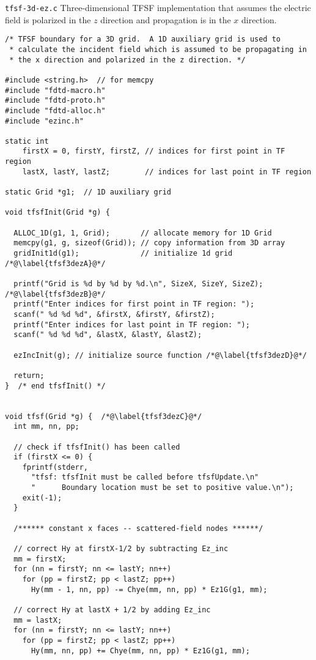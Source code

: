 \begin{program}
  {\tt tfsf-3d-ez.c} Three-dimensional TFSF implementation that
  assumes the electric field is polarized in the $z$ direction and
  propagation is in the $x$ direction.
\label{pro:3dTfsfEz}
\codemiddle
\begin{lstlisting}
/* TFSF boundary for a 3D grid.  A 1D auxiliary grid is used to
 * calculate the incident field which is assumed to be propagating in
 * the x direction and polarized in the z direction. */

#include <string.h>  // for memcpy
#include "fdtd-macro.h"
#include "fdtd-proto.h"
#include "fdtd-alloc.h"
#include "ezinc.h"

static int 
    firstX = 0, firstY, firstZ, // indices for first point in TF region
    lastX, lastY, lastZ;        // indices for last point in TF region

static Grid *g1;  // 1D auxiliary grid

void tfsfInit(Grid *g) {

  ALLOC_1D(g1, 1, Grid);       // allocate memory for 1D Grid
  memcpy(g1, g, sizeof(Grid)); // copy information from 3D array
  gridInit1d(g1);              // initialize 1d grid /*@\label{tfsf3dezA}@*/

  printf("Grid is %d by %d by %d.\n", SizeX, SizeY, SizeZ); /*@\label{tfsf3dezB}@*/
  printf("Enter indices for first point in TF region: ");
  scanf(" %d %d %d", &firstX, &firstY, &firstZ);
  printf("Enter indices for last point in TF region: ");
  scanf(" %d %d %d", &lastX, &lastY, &lastZ);

  ezIncInit(g); // initialize source function /*@\label{tfsf3dezD}@*/

  return;
}  /* end tfsfInit() */


void tfsf(Grid *g) {  /*@\label{tfsf3dezC}@*/
  int mm, nn, pp;

  // check if tfsfInit() has been called
  if (firstX <= 0) {
    fprintf(stderr,
      "tfsf: tfsfInit must be called before tfsfUpdate.\n"
      "      Boundary location must be set to positive value.\n");
    exit(-1);
  }

  /****** constant x faces -- scattered-field nodes ******/

  // correct Hy at firstX-1/2 by subtracting Ez_inc
  mm = firstX;
  for (nn = firstY; nn <= lastY; nn++)
    for (pp = firstZ; pp < lastZ; pp++)
      Hy(mm - 1, nn, pp) -= Chye(mm, nn, pp) * Ez1G(g1, mm);

  // correct Hy at lastX + 1/2 by adding Ez_inc
  mm = lastX;
  for (nn = firstY; nn <= lastY; nn++)
    for (pp = firstZ; pp < lastZ; pp++)
      Hy(mm, nn, pp) += Chye(mm, nn, pp) * Ez1G(g1, mm);


\end{lstlisting}
\end{program}
